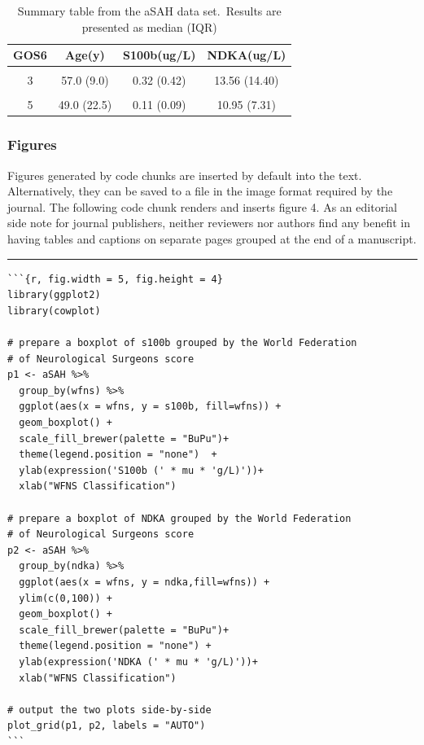 \documentclass[]{elsarticle} %
\begin{document}
\begin{table}[H]

\caption{\label{tab:table1}Summary table from the aSAH data set.\
  Results are presented as median (IQR)}
\centering
\begin{tabular}[t]{cccc}
\toprule
GOS6 & Age(y) & S100b(ug/L) & NDKA(ug/L)\\
\midrule
\cellcolor[HTML]{E0FAFA}{1} & \cellcolor[HTML]{E0FAFA}{52.0 (21.2)} & \cellcolor[HTML]{E0FAFA}{0.29 (0.44)} & \cellcolor[HTML]{E0FAFA}{13.43 (9.81)}\\
3 & 57.0 (9.0) & 0.32 (0.42) & 13.56 (14.40)\\
\cellcolor[HTML]{E0FAFA}{4} & \cellcolor[HTML]{E0FAFA}{55.0 (16.0)} & \cellcolor[HTML]{E0FAFA}{0.12 (0.07)} & \cellcolor[HTML]{E0FAFA}{9.53 (6.80)}\\
5 & 49.0 (22.5) & 0.11 (0.09) & 10.95 (7.31)\\
\bottomrule
\end{tabular}
\end{table}

\hypertarget{figures}{%
\subsubsection{Figures}\label{figures}}

Figures generated by code chunks are inserted by default into the text.
Alternatively, they can be saved to a file in the image format required
by the journal. The following code chunk renders and inserts figure 4.
As an editorial side note for journal publishers, neither reviewers nor
authors find any benefit in having tables and captions on separate pages
grouped at the end of a manuscript.

\begin{center}\rule{0.5\linewidth}{0.5pt}\end{center}

\begin{verbatim}
```{r, fig.width = 5, fig.height = 4}
library(ggplot2)
library(cowplot)

# prepare a boxplot of s100b grouped by the World Federation 
# of Neurological Surgeons score
p1 <- aSAH %>%
  group_by(wfns) %>%
  ggplot(aes(x = wfns, y = s100b, fill=wfns)) +
  geom_boxplot() + 
  scale_fill_brewer(palette = "BuPu")+
  theme(legend.position = "none")  +
  ylab(expression('S100b (' * mu * 'g/L)'))+
  xlab("WFNS Classification")
  
# prepare a boxplot of NDKA grouped by the World Federation
# of Neurological Surgeons score  
p2 <- aSAH %>%
  group_by(ndka) %>%
  ggplot(aes(x = wfns, y = ndka,fill=wfns)) +
  ylim(c(0,100)) +
  geom_boxplot() +
  scale_fill_brewer(palette = "BuPu")+
  theme(legend.position = "none") +
  ylab(expression('NDKA (' * mu * 'g/L)'))+
  xlab("WFNS Classification")

# output the two plots side-by-side  
plot_grid(p1, p2, labels = "AUTO")
```
\end{verbatim}
\end{document}
